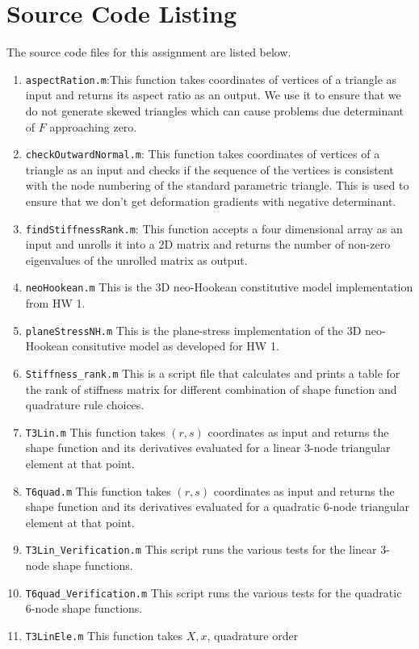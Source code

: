 \documentclass[../main.tex]{subfiles}
\begin{document}
\section*{Source Code Listing}
The source code files for this assignment are listed below.
\begin{enumerate}
\item \texttt{aspectRation.m}:This function takes coordinates of
  vertices of a triangle as input and returns its aspect ratio as an
  output. We use it to ensure that we do not generate skewed triangles
  which can cause problems due determinant of $F$ approaching zero.
\item \texttt{checkOutwardNormal.m}: This function takes coordinates
  of vertices of a triangle as an input and checks if the sequence of
  the vertices is consistent with the node numbering of the standard
  parametric triangle. This is used to ensure that we don't get
  deformation gradients with negative determinant.
\item \texttt{findStiffnessRank.m}: This function accepts a four
  dimensional array as an input and unrolls it into a 2D matrix and
  returns the number of non-zero eigenvalues of the unrolled matrix as
  output.
\item \texttt{neoHookean.m} This is the 3D neo-Hookean constitutive
  model implementation from HW 1.
\item \texttt{planeStressNH.m} This is the plane-stress implementation
  of the 3D neo-Hookean consitutive model as developed for HW 1.
\item \texttt{Stiffness\_rank.m} This is a script file that calculates
  and prints a table for the rank of stiffness matrix for different
  combination of shape function and quadrature rule choices.
\item \texttt{T3Lin.m} This function takes $(r,s)$ coordinates as
  input and returns the shape function and its derivatives evaluated
  for a linear 3-node triangular element at that point.
\item \texttt{T6quad.m} This function takes $(r,s)$ coordinates as
  input and returns the shape function and its derivatives evaluated
  for a quadratic 6-node triangular element at that point.
\item \texttt{T3Lin\_Verification.m} This script runs the various tests
  for the linear 3-node shape functions.
\item \texttt{T6quad\_Verification.m} This script runs the various tests
  for the quadratic 6-node shape functions.
\item \texttt{T3LinEle.m} This function takes $X,x$, quadrature order

\end{enumerate}
\end{document}
